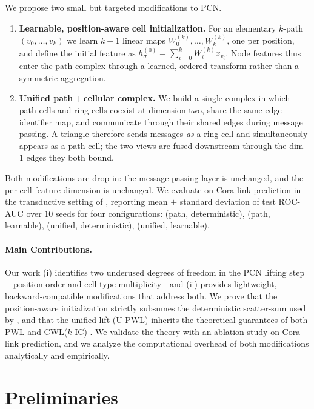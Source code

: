 \documentclass[letterpaper]{article} %
\begin{document}
We propose two small but targeted modifications to PCN.
\begin{enumerate}
    \item \textbf{Learnable, position-aware cell initialization.} For an elementary \(k\)-path \((v_0, \ldots, v_k)\) we learn \(k+1\) linear maps \(W_0^{(k)}, \ldots, W_k^{(k)}\), one per position, and define the initial feature as \(h_\sigma^{(0)} = \sum_{i=0}^{k} W_i^{(k)} x_{v_i}\). Node features thus enter the path-complex through a learned, ordered transform rather than a symmetric aggregation.
    \item \textbf{Unified path\,+\,cellular complex.} We build a single complex in which path-cells and ring-cells coexist at dimension two, share the same edge identifier map, and communicate through their shared edges during message passing. A triangle therefore sends messages \emph{as} a ring-cell and simultaneously appears as a path-cell; the two views are fused downstream through the dim-\(1\) edges they both bound.
\end{enumerate}

Both modifications are drop-in: the message-passing layer is unchanged, and the per-cell feature dimension is unchanged. We evaluate on Cora link prediction in the transductive setting of \cite{kipf_variational_2016}, reporting mean \(\pm\) standard deviation of test ROC-AUC over \(10\) seeds for four configurations: (path, deterministic), (path, learnable), (unified, deterministic), (unified, learnable).

\paragraph{Main Contributions.} Our work (i) identifies two underused degrees of freedom in the PCN lifting step---position order and cell-type multiplicity---and (ii) provides lightweight, backward-compatible modifications that address both. We prove that the position-aware initialization strictly subsumes the deterministic scatter-sum used by \cite{truong_weisfeiler_2024}, and that the unified lift (U-PWL) inherits the theoretical guarantees of both PWL \cite{truong_weisfeiler_2024} and CWL(\(k\)-IC) \cite{bodnar_weisfeiler_2022}. We validate the theory with an ablation study on Cora link prediction, and we analyze the computational overhead of both modifications analytically and empirically.

\section{Preliminaries} \label{section:prelim}
\end{document}
